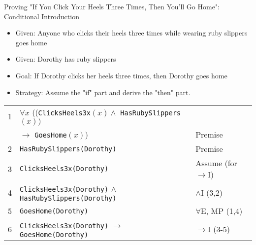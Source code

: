 \documentclass{beamer}
\begin{document}
	\begin{frame}{Proving "If You Click Your Heels Three Times, Then You'll Go Home": Conditional Introduction}
		\begin{itemize}
			\item Given: Anyone who clicks their heels three times while wearing ruby slippers goes home
			\item Given: Dorothy has ruby slippers
			\item Goal: If Dorothy clicks her heels three times, then Dorothy goes home
			\item Strategy: Assume the "if" part and derive the "then" part.
		\end{itemize}
		
		\begin{example}
			\scriptsize{
			\begin{tabular}{|c|l|l|}
				\hline
				1 & $\forall x$ ((\texttt{ClicksHeels3x}$(x) \land$ \texttt{HasRubySlippers}$(x))$ & \\
				& $\rightarrow$ \texttt{GoesHome}$(x)$) & Premise \\
				2 & \texttt{HasRubySlippers(Dorothy)} & Premise \\
				\hline
				3 & \quad \texttt{ClicksHeels3x(Dorothy)} & Assume (for $\rightarrow$I) \\
				4 & \quad \texttt{ClicksHeels3x(Dorothy)} $\land$ \texttt{HasRubySlippers(Dorothy)} & $\land$I (3,2) \\
				5 & \quad \texttt{GoesHome(Dorothy)} & $\forall$E, MP (1,4) \\
				\hline
				6 & \texttt{ClicksHeels3x(Dorothy)} $\rightarrow$ \texttt{GoesHome(Dorothy)} & $\rightarrow$I (3-5) \\
				\hline
			\end{tabular}
		}
		\end{example}
	\end{frame}
	
\end{document}
